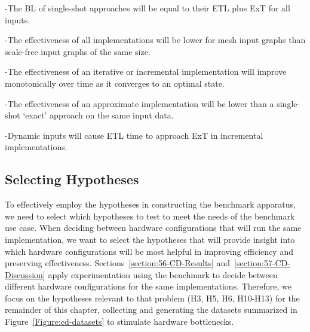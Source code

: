 \hyp{The \ac{BL} of single-shot approaches will be equal to their \ac{ETL} plus \ac{ExT} for all inputs.} 

\hyp{The effectiveness of all implementations will be lower for mesh input graphs than scale-free input graphs of the same size.}

\hyp{The effectiveness of an iterative or incremental implementation will improve monotonically over time as it converges to an optimal state.}

\hyp{The effectiveness of an approximate implementation will be lower than a single-shot `exact' approach on the same input data.}

\hyp{Dynamic inputs will cause \ac{ETL} time to approach \ac{ExT} in incremental implementations.}

\subsection{Selecting Hypotheses}
To effectively employ the hypotheses in constructing the benchmark apparatus, we need to select which hypotheses to test to meet the needs of the benchmark use case. 
When deciding between hardware configurations that will run the same implementation, we want to select the hypotheses that will provide insight into which hardware configurations will be most helpful in improving efficiency and preserving effectiveness.
Sections~\ref{section:56-CD-Results} and~\ref{section:57-CD-Discussion} apply experimentation using the \gai benchmark to decide between different hardware configurations for the same implementations. 
Therefore, we focus on the hypotheses relevant to that problem (H3, H5, H6, H10-H13) for the remainder of this chapter, collecting and generating the datasets summarized in Figure~\ref{Figure:cd-datasets} to stimulate hardware bottlenecks. 





